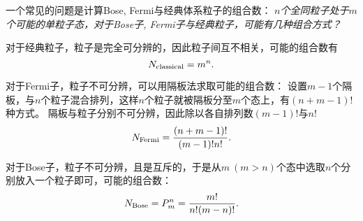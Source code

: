 \begin{tcolorbox}[breakable, colframe=blue, colback=blue!10, title={\textbf{Bose, Fermi与经典体系粒子的组合数计算}}]

    一个常见的问题是计算Bose, Fermi与经典体系粒子的组合数：
    $n$\emph{个全同粒子处于}$m$\emph{个可能的单粒子态，对于Bose子, Fermi子与经典粒子，可能有几种组合方式？}

    对于经典粒子，粒子是完全可分辨的，因此粒子间互不相关，可能的组合数有
    \begin{equation}
        N_{\rm{classical}} = m^n.
    \end{equation}

    对于Fermi子，粒子不可分辨，可以用隔板法求取可能的组合数：
    设置$m-1$个隔板，与$n$个粒子混合排列，这样$n$个粒子就被隔板分至$m$个态上，有$(n+m-1)!$种方式。
    隔板与粒子分别不可分辨，因此除以各自排列数$(m-1)!$与$n!$
    \begin{equation}
        N_{\rm{Fermi}} = \frac{(n+m-1)!}{(m-1)! n!}.
    \end{equation}

    对于Bose子，粒子不可分辨，且是互斥的，于是从$m\ (m>n)$个态中选取$n$个分别放入一个粒子即可，可能的组合数：
    \begin{equation}
        N_{\rm{Bose}} = P_m^n = \frac{m!}{n!(m-n)!}.
    \end{equation}

\end{tcolorbox}
